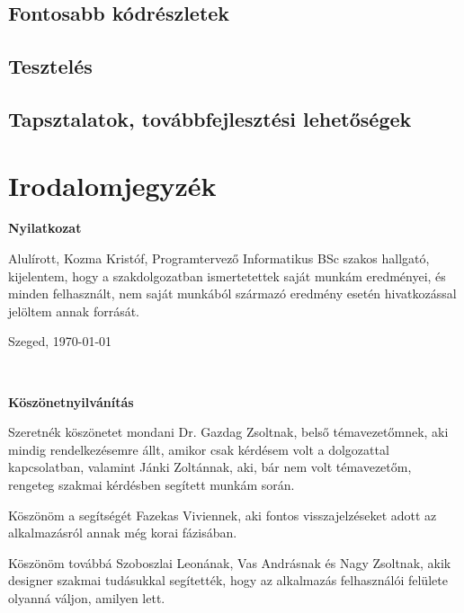 \documentclass[a4paper,12pt]{report}
\begin{document}
\section{Fontosabb kódrészletek}

\section{Tesztelés}

\section{Tapsztalatok, továbbfejlesztési lehetőségek}


\chapter*{Irodalomjegyzék}

\newpage
{\Huge \bf Nyilatkozat}


\vspace{2 cm}

Alulírott, Kozma Kristóf, Programtervező Informatikus BSc szakos hallgató, kijelentem, hogy a szakdolgozatban ismertetettek saját munkám eredményei, és minden felhasznált, nem saját munkából származó eredmény esetén hivatkozással jelöltem annak forrását. 


\begin{flushleft}
\vspace*{1cm}
Szeged, \today
\end{flushleft}

\begin{flushright}
   \vspace*{1cm}
   \makebox[7cm]{\rule{6cm}{.4pt}}\\
\end{flushright}


\newpage
{\Huge \bf Köszönetnyilvánítás}


\vspace{2 cm}

Szeretnék köszönetet mondani Dr. Gazdag Zsoltnak, belső témavezetőmnek, aki mindig rendelkezésemre állt, amikor csak kérdésem volt a dolgozattal kapcsolatban, valamint Jánki Zoltánnak, aki, bár nem volt témavezetőm, rengeteg szakmai kérdésben segített munkám során.

Köszönöm a segítségét Fazekas Viviennek, aki fontos visszajelzéseket adott az alkalmazásról annak még korai fázisában.

Köszönöm továbbá Szoboszlai Leonának, Vas Andrásnak és Nagy Zsoltnak, akik designer szakmai tudásukkal segítették, hogy az alkalmazás felhasználói felülete olyanná váljon, amilyen lett.
\end{document}
